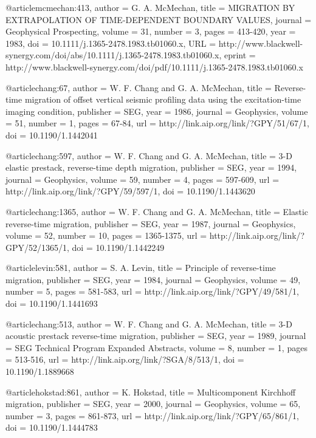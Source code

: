 @article{mcmechan:413,
  author =	 {G. A. McMechan},
  title =	 {MIGRATION BY EXTRAPOLATION OF TIME-DEPENDENT
                  BOUNDARY VALUES},
  journal =	 {Geophysical Prospecting},
  volume =	 31,
  number =	 3,
  pages =	 {413-420},
  year =	 1983,
  doi =		 {10.1111/j.1365-2478.1983.tb01060.x},
  URL =
                  {http://www.blackwell-synergy.com/doi/abs/10.1111/j.1365-2478.1983.tb01060.x},
  eprint =
                  {http://www.blackwell-synergy.com/doi/pdf/10.1111/j.1365-2478.1983.tb01060.x}
}

@article{chang:67,
  author =	 {W. F. Chang and G. A. McMechan},
  title =	 {Reverse-time migration of offset vertical seismic
                  profiling data using the excitation-time imaging
                  condition},
  publisher =	 {SEG},
  year =	 1986,
  journal =	 {Geophysics},
  volume =	 51,
  number =	 1,
  pages =	 {67-84},
  url =		 {http://link.aip.org/link/?GPY/51/67/1},
  doi =		 {10.1190/1.1442041}
}

@article{chang:597,
  author =	 {W. F. Chang and G. A. McMechan},
  title =	 {3-{D} elastic prestack, reverse-time depth
                  migration},
  publisher =	 {SEG},
  year =	 1994,
  journal =	 {Geophysics},
  volume =	 59,
  number =	 4,
  pages =	 {597-609},
  url =		 {http://link.aip.org/link/?GPY/59/597/1},
  doi =		 {10.1190/1.1443620}
}

@article{chang:1365,
  author =	 {W. F. Chang and G. A. McMechan},
  title =	 {Elastic reverse-time migration},
  publisher =	 {SEG},
  year =	 1987,
  journal =	 {Geophysics},
  volume =	 52,
  number =	 10,
  pages =	 {1365-1375},
  url =		 {http://link.aip.org/link/?GPY/52/1365/1},
  doi =		 {10.1190/1.1442249}
}

@article{levin:581,
  author =	 {S. A. Levin},
  title =	 {Principle of reverse-time migration},
  publisher =	 {SEG},
  year =	 1984,
  journal =	 {Geophysics},
  volume =	 49,
  number =	 5,
  pages =	 {581-583},
  url =		 {http://link.aip.org/link/?GPY/49/581/1},
  doi =		 {10.1190/1.1441693}
}

@article{chang:513,
  author =	 {W. F. Chang and G. A. McMechan},
  title =	 {3-{D} acoustic prestack reverse-time migration},
  publisher =	 {SEG},
  year =	 1989,
  journal =	 {SEG Technical Program Expanded Abstracts},
  volume =	 8,
  number =	 1,
  pages =	 {513-516},
  url =		 {http://link.aip.org/link/?SGA/8/513/1},
  doi =		 {10.1190/1.1889668}
}

@article{hokstad:861,
  author =	 {K. Hokstad},
  title =	 {Multicomponent {K}irchhoff migration},
  publisher =	 {SEG},
  year =	 2000,
  journal =	 {Geophysics},
  volume =	 65,
  number =	 3,
  pages =	 {861-873},
  url =		 {http://link.aip.org/link/?GPY/65/861/1},
  doi =		 {10.1190/1.1444783}
}

